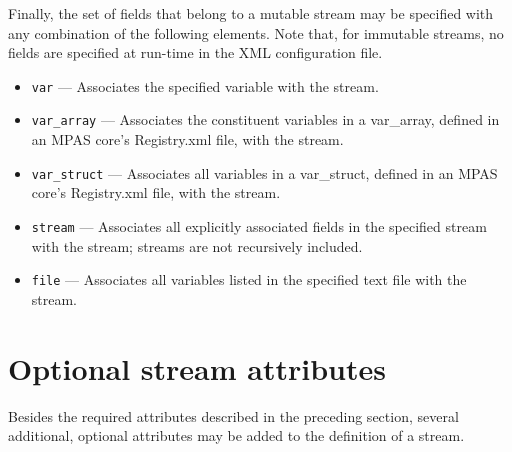 Finally, the set of fields that belong to a mutable stream may be specified with any combination of the following elements. Note that, for 
immutable streams, no fields are specified at run-time in the XML configuration file.

\begin{itemize}
\item {\tt var} --- Associates the specified variable with the stream.
\item {\tt var\_array} --- Associates the constituent variables in a var\_array, defined in an MPAS core's Registry.xml file, with the stream.
\item {\tt var\_struct} --- Associates all variables in a var\_struct, defined in an MPAS core's Registry.xml file, with the stream.
\item {\tt stream} --- Associates all explicitly associated fields in the specified stream with the stream; streams are not recursively included.
\item {\tt file} --- Associates all variables listed in the specified text file with the stream.
\end{itemize}

\section{Optional stream attributes}
\label{sec:optional_stream_atts} 

Besides the required attributes described in the preceding section, several additional, optional attributes may be added to
the definition of a stream.

